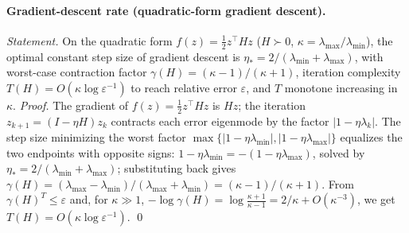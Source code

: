 \documentclass[11pt]{article}
\numberwithin{equation}{section}
\begin{document}
\paragraph{Gradient-descent rate (quadratic-form gradient descent).}
\emph{Statement.} On the quadratic form $f(z)=\tfrac12z^\top Hz$ ($H\succ0$, $\kappa=\lambda_{\max}/\lambda_{\min}$), the optimal constant step size of gradient descent is $\eta_*=2/(\lambda_{\min}+\lambda_{\max})$, with worst-case contraction factor $\gamma(H)=(\kappa-1)/(\kappa+1)$, iteration complexity $T(H)=O(\kappa\log\varepsilon^{-1})$ to reach relative error $\varepsilon$, and $T$ monotone increasing in $\kappa$.
\emph{Proof.} The gradient of $f(z)=\tfrac12z^\top Hz$ is $Hz$; the iteration $z_{k+1}=(I-\eta H)z_k$ contracts each error eigenmode by the factor $|1-\eta\lambda_k|$. The step size minimizing the worst factor $\max\{|1-\eta\lambda_{\min}|,|1-\eta\lambda_{\max}|\}$ equalizes the two endpoints with opposite signs: $1-\eta\lambda_{\min}=- (1-\eta\lambda_{\max})$, solved by $\eta_*=2/(\lambda_{\min}+\lambda_{\max})$; substituting back gives $\gamma(H)=(\lambda_{\max}-\lambda_{\min})/(\lambda_{\max}+\lambda_{\min})=(\kappa-1)/(\kappa+1)$. From $\gamma(H)^T\le\varepsilon$ and, for $\kappa\gg1$, $-\log\gamma(H)=\log\frac{\kappa+1}{\kappa-1}=2/\kappa+O(\kappa^{-3})$, we get $T(H)=O(\kappa\log\varepsilon^{-1})$. \qed
\end{document}
